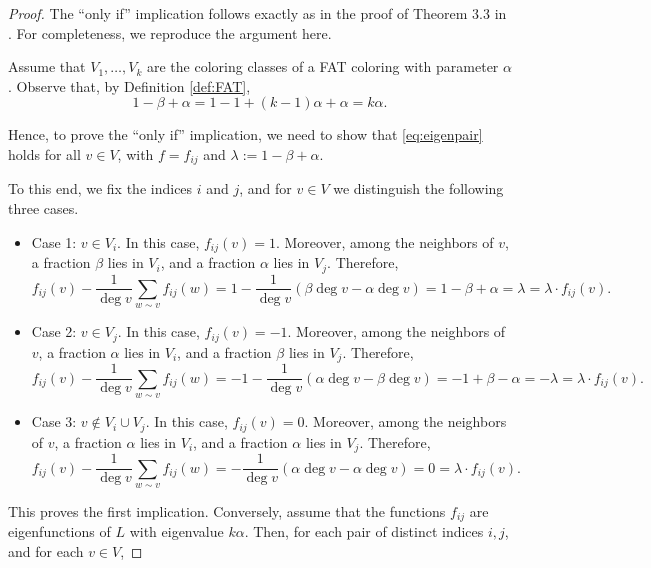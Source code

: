 \documentclass{article}
\theoremstyle{plain}
\theoremstyle{definition}
\theoremstyle{remark}
\begin{document}
\begin{proof}

The ``only if'' implication follows exactly as in the proof of Theorem 3.3 in \cite{beersmulasFAT}. For completeness, we reproduce the argument here.


Assume that $V_1,\ldots,V_k$ are the coloring classes of a FAT coloring with parameter $\alpha$. Observe that, by Definition \ref{def:FAT},
$$
1-\beta+\alpha = 1-1+ (k-1)\alpha + \alpha = k\alpha.
$$

Hence, to prove the ``only if'' implication, we need to show that \eqref{eq:eigenpair} holds for all $v\in V$, with $f=f_{ij}$ and $\lambda:=1-\beta+\alpha$.

To this end, we fix the indices $i$ and $j$, and for $v\in V$ we distinguish the following three cases.

\begin{itemize}

\item Case 1: $v\in V_i$. In this case, $f_{ij}(v)=1$. Moreover, among the neighbors of $v$, a fraction $\beta$ lies in $V_i$, and a fraction $\alpha$ lies in $V_j$. Therefore,
$$
f_{ij}(v)-\frac{1}{\deg v}\sum_{w\sim v}f_{ij}(w)=1-\frac{1}{\deg v}\left(\beta \deg v- \alpha \deg v \right)=1-\beta + \alpha = \lambda = \lambda \cdot f_{ij}(v).
$$
    
    \item Case 2: $v\in V_j$. In this case, $f_{ij}(v)=-1$. Moreover, among the neighbors of $v$, a fraction $\alpha$ lies in $V_i$, and a fraction $\beta$ lies in $V_j$. Therefore,
$$
f_{ij}(v)-\frac{1}{\deg v}\sum_{w\sim v}f_{ij}(w)=-1-\frac{1}{\deg v}\left(\alpha \deg v- \beta \deg v \right)=-1+\beta - \alpha = -\lambda = \lambda \cdot f_{ij}(v).
$$

    
    \item Case 3: $v\notin V_i\cup V_j$. In this case, $f_{ij}(v)=0$. Moreover, among the neighbors of $v$, a fraction $\alpha$ lies in $V_i$, and a fraction $\alpha$ lies in $V_j$. Therefore,
$$
f_{ij}(v)-\frac{1}{\deg v}\sum_{w\sim v}f_{ij}(w)=-\frac{1}{\deg v}\left(\alpha \deg v- \alpha \deg v \right)=0=\lambda \cdot f_{ij}(v).
$$

    
\end{itemize}


This proves the first implication. Conversely, assume that the functions $f_{ij}$ are eigenfunctions of $L$ with eigenvalue $k\alpha$. Then, for each pair of distinct indices $i,j$, and for each $v\in V$,


\end{proof}
\end{document}
